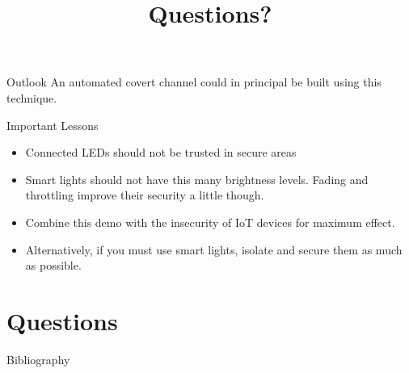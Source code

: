 \documentclass[11pt,t,usepdftitle=false,aspectratio=169]{beamer}
\begin{document}
\begin{frame}{Outlook} %
	An automated covert channel could in principal be built using this technique.

	\begin{block}{Important Lessons}
		\begin{itemize}
			\item Connected LEDs should not be trusted in secure areas
			\item Smart lights should not have this many brightness levels. Fading and throttling improve their security a little though.
			\item Combine this demo with the insecurity of IoT devices for maximum effect.
			\item Alternatively, if you must use smart lights, isolate and secure them as much as possible.
		\end{itemize}
	\end{block}

\end{frame}



\title{Questions?}
\subtitle{}
\section{Questions}


\appendix

\begin{frame}[allowframebreaks]{Bibliography}
	
	
\end{frame}
\end{document}
